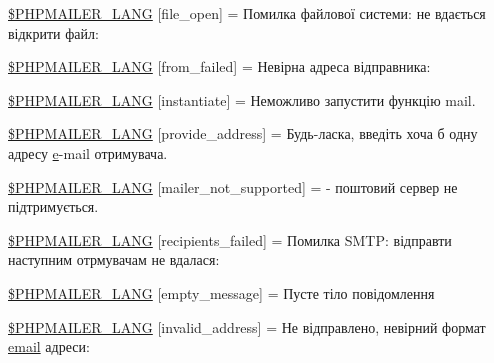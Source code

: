\begin{DoxyCompactItemize}
\item 
\hyperlink{phpmailer_8lang-uk_8php_a28d1a6517bf4c942a0ddd506188ad2e0}{\$\+P\+H\+P\+M\+A\+I\+L\+E\+R\+\_\+\+L\+A\+NG} \mbox{[}\textquotesingle{}file\+\_\+open\textquotesingle{}\mbox{]} = \textquotesingle{}Помилка файлової системи\+: не вдається відкрити файл\+: \textquotesingle{}
\item 
\hyperlink{phpmailer_8lang-uk_8php_adf832ae12155a09be077c6d5e4fd7e22}{\$\+P\+H\+P\+M\+A\+I\+L\+E\+R\+\_\+\+L\+A\+NG} \mbox{[}\textquotesingle{}from\+\_\+failed\textquotesingle{}\mbox{]} = \textquotesingle{}Невірна адреса відправника\+: \textquotesingle{}
\item 
\hyperlink{phpmailer_8lang-uk_8php_ad58dde16780f4770ccf4dd282ea1f5ad}{\$\+P\+H\+P\+M\+A\+I\+L\+E\+R\+\_\+\+L\+A\+NG} \mbox{[}\textquotesingle{}instantiate\textquotesingle{}\mbox{]} = \textquotesingle{}Неможливо запустити функцію mail.\textquotesingle{}
\item 
\hyperlink{phpmailer_8lang-uk_8php_a8b97897c2406b7392b056f375feeefbb}{\$\+P\+H\+P\+M\+A\+I\+L\+E\+R\+\_\+\+L\+A\+NG} \mbox{[}\textquotesingle{}provide\+\_\+address\textquotesingle{}\mbox{]} = \textquotesingle{}Будь-\/ласка, введіть хоча б одну адресу \hyperlink{jquery-ui_8min_8js_abea95a4e94bc6f4151d5683d4c12c3f4}{e}-\/mail отримувача.\textquotesingle{}
\item 
\hyperlink{phpmailer_8lang-uk_8php_aa2ebcb8833ee83a7ad67401c4bb3a6ad}{\$\+P\+H\+P\+M\+A\+I\+L\+E\+R\+\_\+\+L\+A\+NG} \mbox{[}\textquotesingle{}mailer\+\_\+not\+\_\+supported\textquotesingle{}\mbox{]} = \textquotesingle{} -\/ поштовий сервер не підтримується.\textquotesingle{}
\item 
\hyperlink{phpmailer_8lang-uk_8php_a7589d30bb9b368327c2df015f3e6bcba}{\$\+P\+H\+P\+M\+A\+I\+L\+E\+R\+\_\+\+L\+A\+NG} \mbox{[}\textquotesingle{}recipients\+\_\+failed\textquotesingle{}\mbox{]} = \textquotesingle{}Помилка S\+M\+T\+P\+: відправти наступним отрмувачам не вдалася\+: \textquotesingle{}
\item 
\hyperlink{phpmailer_8lang-uk_8php_a33772099f637c9d6c2cd7425e0e37fed}{\$\+P\+H\+P\+M\+A\+I\+L\+E\+R\+\_\+\+L\+A\+NG} \mbox{[}\textquotesingle{}empty\+\_\+message\textquotesingle{}\mbox{]} = \textquotesingle{}Пусте тіло повідомлення\textquotesingle{}
\item 
\hyperlink{phpmailer_8lang-uk_8php_a42d61bcea4c79599ecb44fd062f54d47}{\$\+P\+H\+P\+M\+A\+I\+L\+E\+R\+\_\+\+L\+A\+NG} \mbox{[}\textquotesingle{}invalid\+\_\+address\textquotesingle{}\mbox{]} = \textquotesingle{}Не відправлено, невірний формат \hyperlink{actions_2account_8php_a011c66ae212438e0d7de7c0e40451bb3}{email} адреси\+: \textquotesingle{}

\end{DoxyCompactItemize}

